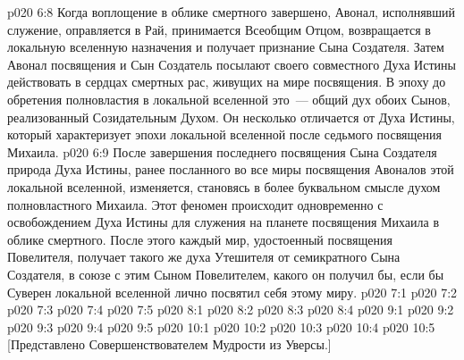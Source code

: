 \vs p020 6:8 Когда воплощение в облике смертного завершено, Авонал, исполнявший служение, оправляется в Рай, принимается Всеобщим Отцом, возвращается в локальную вселенную назначения и получает признание Сына Создателя. Затем Авонал посвящения и Сын Создатель посылают своего совместного Духа Истины действовать в сердцах смертных рас, живущих на мире посвящения. В эпоху до обретения полновластия в локальной вселенной это~--- общий дух обоих Сынов, реализованный Созидательным Духом. Он несколько отличается от Духа Истины, который характеризует эпохи локальной вселенной после седьмого посвящения Михаила.
\vs p020 6:9 После завершения последнего посвящения Сына Создателя природа Духа Истины, ранее посланного во все миры посвящения Авоналов этой локальной вселенной, изменяется, становясь в более буквальном смысле духом полновластного Михаила. Этот феномен происходит одновременно с освобождением Духа Истины для служения на планете посвящения Михаила в облике смертного. После этого каждый мир, удостоенный посвящения Повелителя, получает такого же духа Утешителя от семикратного Сына Создателя, в союзе с этим Сыном Повелителем, какого он получил бы, если бы Суверен локальной вселенной лично посвятил себя этому миру.
\vs p020 7:1 
\vs p020 7:2 
\vs p020 7:3 
\vs p020 7:4 
\vs p020 7:5 
\vs p020 8:1 
\vs p020 8:2 
\vs p020 8:3 
\vs p020 8:4 
\vs p020 9:1 
\vs p020 9:2 
\vs p020 9:3 
\vs p020 9:4 
\vs p020 9:5 \pc 
{}
\vs p020 10:1 
\vs p020 10:2 
\vs p020 10:3 
\vs p020 10:4 
\vsetoff
\vs p020 10:5 [Представлено Совершенствователем Мудрости из Уверсы.]
\quizlink
